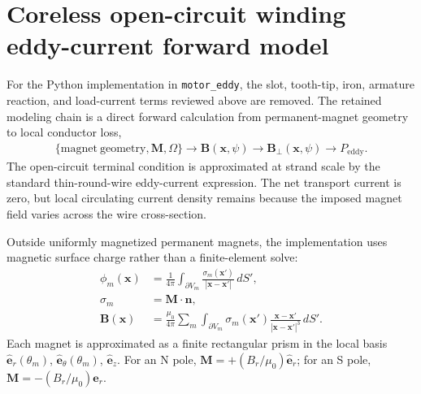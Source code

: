 \documentclass[a4paper, 11pt]{article}
\begin{document}
\section{Coreless open-circuit winding eddy-current forward model}

For the Python implementation in \texttt{motor\_eddy}, the slot, tooth-tip, iron, armature reaction, and load-current terms reviewed above are removed.  The retained modeling chain is a direct forward calculation from permanent-magnet geometry to local conductor loss,
\begin{align}
    \{\mathrm{magnet\ geometry},\mathbf{M},\Omega\}
    \rightarrow \mathbf{B}(\mathbf{x},\psi)
    \rightarrow \mathbf{B}_{\perp}(\mathbf{x},\psi)
    \rightarrow P_{\mathrm{eddy}} .
\end{align}
The open-circuit terminal condition is approximated at strand scale by the standard thin-round-wire eddy-current expression.  The net transport current is zero, but local circulating current density remains because the imposed magnet field varies across the wire cross-section.

Outside uniformly magnetized permanent magnets, the implementation uses magnetic surface charge rather than a finite-element solve:
\begin{align}
    \phi_m(\mathbf{x}) &= \frac{1}{4\pi}\int_{\partial V_m}\frac{\sigma_m(\mathbf{x}')}{|\mathbf{x}-\mathbf{x}'|}\,dS',\\
    \sigma_m &= \mathbf{M}\cdot\mathbf{n},\\
    \mathbf{B}(\mathbf{x}) &= \frac{\mu_0}{4\pi}\sum_m\int_{\partial V_m}
    \sigma_m(\mathbf{x}')\frac{\mathbf{x}-\mathbf{x}'}{|\mathbf{x}-\mathbf{x}'|^3}\,dS'.
\end{align}
Each magnet is approximated as a finite rectangular prism in the local basis
$\hat{\mathbf e}_r(\theta_m)$, $\hat{\mathbf e}_\theta(\theta_m)$, $\hat{\mathbf e}_z$.
For an N pole, $\mathbf{M}=+(B_r/\mu_0)\hat{\mathbf e}_r$; for an S pole,
$\mathbf{M}=-(B_r/\mu_0)\hat{\mathbf e}_r$.
\end{document}
